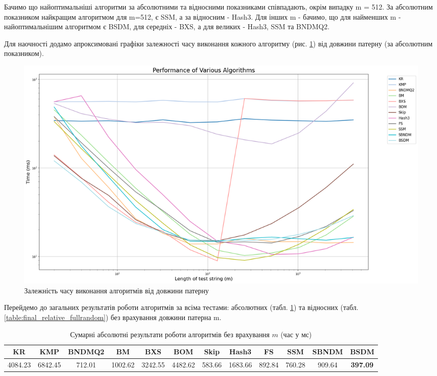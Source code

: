 \documentclass[a4paper,14pt]{extarticle} %
\begin{document}
					Бачимо що найоптимальніші алгоритми за абсолютними та відносними показниками співпадають, окрім випадку m = 512.
					За абсолютним показником найкращим алгоритмом для m=512, є SSM, а за відносним - Hash3.
					Для інших m - бачимо, що для найменших m - найоптимальнішим алгоритмом є BSDM, для середніх - BXS, а для великих - Hash3, SSM та BNDMQ2.

					Для наочності додамо апроксимовані графіки залежності часу виконання кожного алгоритму (рис. \ref{fig:full_random_graph}) від довжини патерну (за абсолютним показником).

					\begin{figure}[H]
						\centering
						\includegraphics[width=1\textwidth]{images/full_random_graph.png}
						\caption{Залежність часу виконання алгоритмів від довжини патерну}
						\label{fig:full_random_graph}
					\end{figure}

					Перейдемо до загальних результатів роботи алгоритмів за всіма тестами: абсолютних (табл. \ref{table:final_absolute_fullrandom}) та відносних (табл. \ref{table:final_relative_fullrandom}) без врахування довжини патерна m.

					\begin{table}[H]
						\centering
						\scriptsize
						\begin{tabular}{|c|c|c|c|c|c|c|c|c|c|c|c|}
						\hline
						\textbf{KR} & \textbf{KMP} & \textbf{BNDMQ2} & \textbf{BM} & \textbf{BXS} & \textbf{BOM} & \textbf{Skip} & \textbf{Hash3} & \textbf{FS} & \textbf{SSM} & \textbf{SBNDM} & \textbf{BSDM} \\
						\hline
						4084.23 & 6842.45 & 712.01 & 1002.62 & 3242.55 & 4482.62 & 583.66 & 1683.66 & 892.84 & 760.28 & 909.64 & \textbf{397.09} \\
						\hline
						\end{tabular}
						\caption{Сумарні абсолютні результати роботи алгоритмів без врахування $m$ (час у мс)}
						\label{table:final_absolute_fullrandom}
					\end{table}
					
\end{document}
